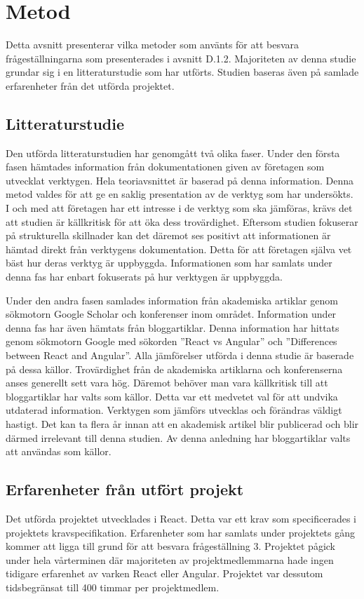 \section{Metod}
\label{sec:axel-method}

Detta avsnitt presenterar vilka metoder som använts för att besvara frågeställningarna som presenterades i avsnitt D.1.2. Majoriteten av denna studie grundar sig i en litteraturstudie som har utförts. Studien baseras även på samlade erfarenheter från det utförda projektet.

\subsection{Litteraturstudie}
Den utförda litteraturstudien har genomgått två olika faser. Under den första fasen hämtades information från dokumentationen given av företagen som utvecklat verktygen. Hela teoriavsnittet är baserad på denna information. Denna metod valdes för att ge en saklig presentation av de verktyg som har undersökts. I och med att företagen har ett intresse i de verktyg som ska jämföras, krävs det att studien är källkritisk för att öka dess trovärdighet. Eftersom studien fokuserar på strukturella skillnader kan det däremot ses positivt att informationen är hämtad direkt från verktygens dokumentation. Detta för att företagen själva vet bäst hur deras verktyg är uppbyggda. Informationen som har samlats under denna fas har enbart fokuserats på hur verktygen är uppbyggda. 

Under den andra fasen samlades information från akademiska artiklar genom sökmotorn Google Scholar och konferenser inom området. Information under denna fas har även hämtats från bloggartiklar. Denna information har hittats genom sökmotorn Google med sökorden ''React vs Angular'' och ''Differences between React and Angular''. Alla jämförelser utförda i denna studie är baserade på dessa källor. Trovärdighet från de akademiska artiklarna och konferenserna anses generellt sett vara hög. Däremot behöver man vara källkritisk till att bloggartiklar har valts som källor. Detta var ett medvetet val för att undvika utdaterad information. Verktygen som jämförs utvecklas och förändras väldigt hastigt. Det kan ta flera år innan att en akademisk artikel blir publicerad och blir därmed irrelevant till denna studien. Av denna anledning har bloggartiklar valts att användas som källor.

\subsection{Erfarenheter från utfört projekt}
Det utförda projektet utvecklades i React. Detta var ett krav som specificerades i projektets kravspecifikation. Erfarenheter som har samlats under projektets gång kommer att ligga till grund för att besvara frågeställning 3. Projektet pågick under hela vårterminen där majoriteten av projektmedlemmarna hade ingen tidigare erfarenhet av varken React eller Angular. Projektet var dessutom tidsbegränsat till 400 timmar per projektmedlem. 

